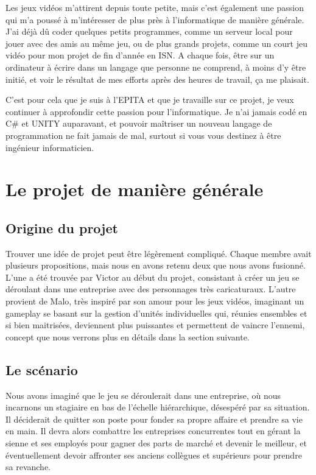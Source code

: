 \documentclass{article}
\begin{document}
Les jeux vidéos m'attirent depuis toute petite, mais c'est également une passion qui m'a poussé à m'intéresser de plus près à l'informatique de manière générale. J'ai déjà dû coder quelques petits programmes, comme un serveur local pour jouer avec des amis au même jeu, ou de plus grands projets, comme un court jeu vidéo pour mon projet de fin d'année en ISN. A chaque fois, être sur un ordinateur à écrire dans un langage que personne ne comprend, à moins d'y être initié, et voir le résultat de mes efforts après des heures de travail, ça me plaisait.


C'est pour cela que je suis à l'EPITA et que je travaille sur ce projet, je veux continuer à approfondir cette passion pour l'informatique. Je n'ai jamais codé en C\# et UNITY auparavant, et pouvoir maîtriser un nouveau langage de programmation ne fait jamais de mal, surtout si vous vous destinez à être ingénieur informaticien.

\section{Le projet de manière générale}
\subsection{Origine du projet}
Trouver une idée de projet peut être légèrement compliqué. Chaque membre avait plusieurs propositions, mais nous en avons retenu deux que nous avons fusionné. L'une a été trouvée par Victor au début du projet, consistant à créer un jeu se déroulant dans une entreprise avec des personnages très caricaturaux. L'autre provient de Malo, très inspiré par son amour pour les jeux vidéos, imaginant un gameplay se basant sur la gestion d'unités individuelles qui, réunies ensembles et si bien maitrisées, deviennent plus puissantes et permettent de vaincre l'ennemi, concept que nous verrons plus en détails dans la section suivante.

\subsection{Le scénario}
Nous avons imaginé que le jeu se déroulerait dans une entreprise, où nous incarnons un stagiaire en bas de l'échelle hiérarchique, désespéré par sa situation. Il déciderait de quitter son poste pour fonder sa propre affaire et prendre sa vie en main. Il devra alors combattre les entreprises concurrentes tout en gérant la sienne et ses employés pour gagner des parts de marché et devenir le meilleur, et éventuellement devoir affronter ses anciens collègues et supérieurs pour prendre sa revanche.
\end{document}
